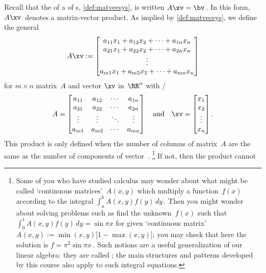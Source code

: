 Recall that the  of a  of s, \cref{def:matvecsys}, is written \(A\xv=\bv\)\,.  
In this form, \(A\xv\)~denotes a matrix-vector product.
As implied by \cref{def:matvecsys}, we define the general  
\begin{equation*}
A\xv:=
\begin{bmatrix} a_{11}x_1+a_{12}x_2+\cdots+a_{1n}x_n
\\a_{21}x_1+a_{22}x_2+\cdots+a_{2n}x_n
\\\vdots
\\a_{m1}x_1+a_{m2}x_2+\cdots+a_{mn}x_n
\end{bmatrix}
\end{equation*}
for \(m\times n\) matrix~\(A\) and vector \(\xv\) in~\(\RR^n\) with \slash {}
\begin{equation*}
A=\begin{bmatrix} a_{11}&a_{12}&\cdots&a_{1n}
\\a_{21}&a_{22}&\cdots&a_{2n}
\\\vdots&\vdots&\ddots&\vdots
\\a_{m1}&a_{m2}&\cdots&a_{mn} \end{bmatrix}
\quad\text{and}\quad
\xv=\begin{bmatrix} x_1\\x_2\\\vdots\\x_n \end{bmatrix}.
\end{equation*}
This product is only defined when the number of columns of matrix~\(A\) are the same as the number of components of vector~\xv.%
\footnote{Some of you who have studied calculus may wonder about what might be called `continuous matrices'~\(A(x,y)\) which multiply a function~\(f(x)\) according to the integral \(\int_a^b A(x,y)f(y)\,dy\)\,.  
Then you might wonder about solving problems such as find the unknown~\(f(x)\) such that \(\int_0^1 A(x,y)f(y)\,dy=\sin\pi x\) for given `continuous matrix' \(A(x,y):=\min(x,y)\big[1-\max(x,y)\big]\); 
you may check that here the solution is \(f=\pi^2\sin\pi x\)\,.
Such notions are a useful generalization of our linear algebra: they are called ; the main structures and patterns developed by this course also apply to such integral equations.}
If not, then the product cannot 

